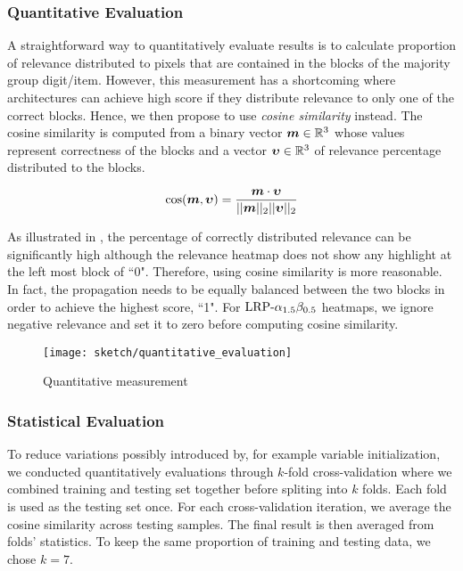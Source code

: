 \subsubsection{Quantitative Evaluation}
A straightforward way to quantitatively evaluate results is to calculate proportion of relevance distributed to pixels that are contained in the blocks of the majority group digit/item. However, this measurement has a shortcoming where architectures can achieve high score if they distribute relevance to only one of the correct blocks. Hence, we then propose to use \textit{cosine similarity} instead. The cosine similarity is computed from  a  binary  vector $\patvector{m} \in \mathbb{R}^3$  whose values represent correctness of the blocks and a vector $\patvector{\upsilon} \in \mathbb{R}^3$ of relevance percentage distributed to the blocks. 

\begin{align}
\cos (\patvector{m}, \patvector{\upsilon}) = \frac{ \patvector{m} \cdot \patvector{\upsilon}}{ || \patvector{m}  ||_2 ||\patvector{\upsilon}   ||_2}	
\end{align}

As illustrated in \addfigure{\ref{fig:quantitative_evaluation}}, the percentage of correctly distributed relevance can be significantly high although the relevance heatmap does not show any highlight at the left most block of ``0". Therefore, using cosine similarity is more reasonable. In fact, the propagation needs to be equally balanced between the two blocks in order to achieve the highest score, ``1". For $\text{LRP-}\alpha_{1.5}\beta_{0.5}$ heatmaps, we ignore negative relevance and set it to zero before computing cosine similarity.

\begin{figure}[!htb]
\centering
\texttt{[image: sketch/quantitative\_evaluation]}
\caption{Quantitative measurement} 
\label{fig:quantitative_evaluation}
\end{figure}

\subsubsection{Statistical Evaluation}
To reduce variations possibly introduced by, for example variable initialization, we conducted quantitatively evaluations through $k$-fold cross-validation where we combined  training and testing set together before spliting into $k$ folds. Each fold is used as the testing set once. For each cross-validation iteration, we average the cosine similarity across testing samples. The final result is then averaged from folds' statistics.  To keep the same proportion of training and testing data, we chose $k=7$. 

